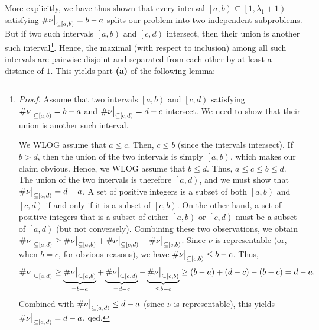 \documentclass[numbers=enddot,12pt,final,onecolumn,notitlepage]{scrartcl}%
\theoremstyle{definition}
\def\seplistvar{{{\nu}}} %
\begin{document}
More explicitly, we have thus shown that every interval $\left[a,b\right) \subseteq \left[1, \lambda_1+1\right)$ satisfying $\#\nuab = b-a$ splits our problem into two independent subproblems. But if two such intervals $\left[a,b\right)$ and $\left[c,d\right)$ intersect, then their union is another such interval\footnote{\textit{Proof.} Assume that two intervals $\left[a,b\right)$ and $\left[c,d\right)$ satisfying $\#\nuab = b-a$ and $\#\nuxy{c}{d} = d-c$ intersect. We need to show that their union is another such interval.
\par We WLOG assume that $a \leq c$. Then, $c \leq b$ (since the intervals intersect). If $b > d$, then the union of the two intervals is simply $\left[a,b\right)$, which makes our claim obvious. Hence, we WLOG assume that $b \leq d$. Thus, $a \leq c \leq b \leq d$. The union of the two intervals is therefore $\left[a, d\right)$, and we must show that $\#\nuxy{a}{d} = d-a$.
A set of positive integers is a subset of both $\left[a, b\right)$ and $\left[c, d\right)$ if and only if it is a subset of $\left[c, b\right)$. On the other hand, a set of positive integers that is a subset of either $\left[a, b\right)$ or $\left[c, d\right)$ must be a subset of $\left[a, d\right)$ (but not conversely). Combining these two observations, we obtain $\#\nuxy{a}{d} \geq \#\nuab + \#\nuxy{c}{d} - \#\nuxy{c}{b}$. Since $\seplistvar$ is representable (or, when $b=c$, for obvious reasons), we have $\#\nuxy{c}{b} \leq b-c$. Thus,
\[
\#\nuxy{a}{d} \geq \underbrace{\#\nuab}_{=b-a} + \underbrace{\#\nuxy{c}{d}}_{=d-c} - \underbrace{\#\nuxy{c}{b}}_{\leq b-c} \geq \left(b-a\right) + \left(d-c\right) - \left(b-c\right) = d-a.
\]
Combined with $\#\nuxy{a}{d} \leq d-a$ (since $\seplistvar$ is representable), this yields $\#\nuxy{a}{d} = d-a$, qed.}. Hence, the maximal (with respect to inclusion) among all such intervals are pairwise disjoint and separated from each other by at least a distance of $1$.
This yields part \textbf{(a)} of the following lemma:
\end{document}
